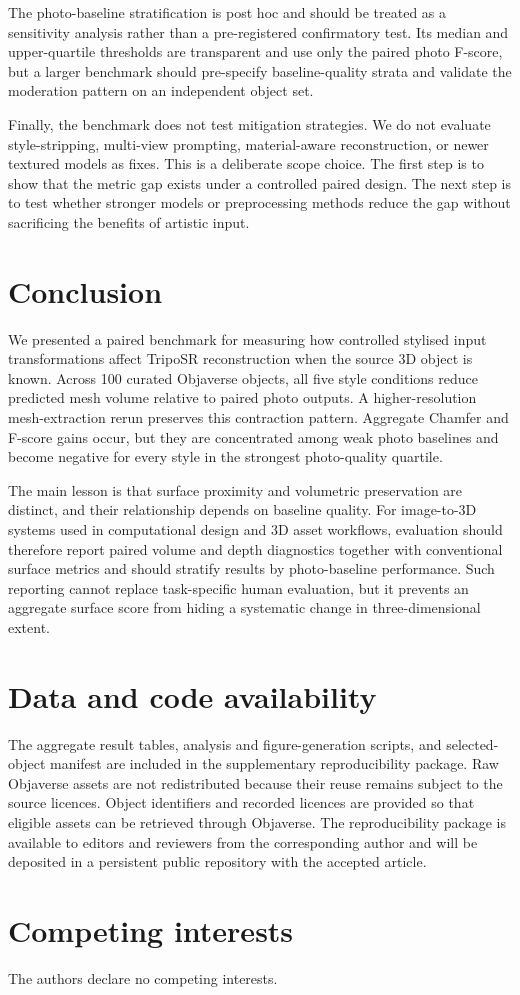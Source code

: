 \documentclass[12pt,a4paper]{article}
\begin{document}
The photo-baseline stratification is post hoc and should be treated as a sensitivity analysis rather than a pre-registered confirmatory test. Its median and upper-quartile thresholds are transparent and use only the paired photo F-score, but a larger benchmark should pre-specify baseline-quality strata and validate the moderation pattern on an independent object set.

Finally, the benchmark does not test mitigation strategies. We do not evaluate style-stripping, multi-view prompting, material-aware reconstruction, or newer textured models as fixes. This is a deliberate scope choice. The first step is to show that the metric gap exists under a controlled paired design. The next step is to test whether stronger models or preprocessing methods reduce the gap without sacrificing the benefits of artistic input.

\section{Conclusion}

We presented a paired benchmark for measuring how controlled stylised input transformations affect TripoSR reconstruction when the source 3D object is known. Across 100 curated Objaverse objects, all five style conditions reduce predicted mesh volume relative to paired photo outputs. A higher-resolution mesh-extraction rerun preserves this contraction pattern. Aggregate Chamfer and F-score gains occur, but they are concentrated among weak photo baselines and become negative for every style in the strongest photo-quality quartile.

The main lesson is that surface proximity and volumetric preservation are distinct, and their relationship depends on baseline quality. For image-to-3D systems used in computational design and 3D asset workflows, evaluation should therefore report paired volume and depth diagnostics together with conventional surface metrics and should stratify results by photo-baseline performance. Such reporting cannot replace task-specific human evaluation, but it prevents an aggregate surface score from hiding a systematic change in three-dimensional extent.

\section*{Data and code availability}

The aggregate result tables, analysis and figure-generation scripts, and selected-object manifest are included in the supplementary reproducibility package. Raw Objaverse assets are not redistributed because their reuse remains subject to the source licences. Object identifiers and recorded licences are provided so that eligible assets can be retrieved through Objaverse. The reproducibility package is available to editors and reviewers from the corresponding author and will be deposited in a persistent public repository with the accepted article.

\section*{Competing interests}

The authors declare no competing interests.

\printbibliography
\end{document}
